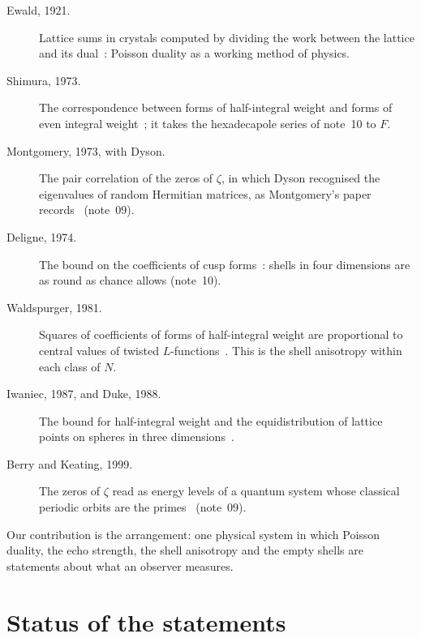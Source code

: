 \documentclass[11pt]{article}
\begin{document}
\begin{description}
\item[Ewald, 1921.] Lattice sums in crystals computed by dividing the work between the lattice and its dual~\cite{Ewald}: Poisson duality as a working method of physics.
\item[Shimura, 1973.] The correspondence between forms of half-integral weight and forms of even integral weight~\cite{Shimura}; it takes the hexadecapole series of note~10 to $F$.
\item[Montgomery, 1973, with Dyson.] The pair correlation of the zeros of $\zeta$, in which Dyson recognised the eigenvalues of random Hermitian matrices, as Montgomery's paper records~\cite{Montgomery} (note~09).
\item[Deligne, 1974.] The bound on the coefficients of cusp forms~\cite{Deligne}: shells in four dimensions are as round as chance allows (note~10).
\item[Waldspurger, 1981.] Squares of coefficients of forms of half-integral weight are proportional to central values of twisted $L$-functions~\cite{Waldspurger}. This is the shell anisotropy within each class of $N$.
\item[Iwaniec, 1987, and Duke, 1988.] The bound for half-integral weight and the equidistribution of lattice points on spheres in three dimensions~\cite{Iwaniec87,Duke}.
\item[Berry and Keating, 1999.] The zeros of $\zeta$ read as energy levels of a quantum system whose classical periodic orbits are the primes~\cite{BerryKeating} (note~09).
\end{description}

\noindent
Our contribution is the arrangement: one physical system in which Poisson duality, the echo strength, the shell anisotropy and the empty shells are statements about what an observer measures.

\section*{Status of the statements}
\end{document}
